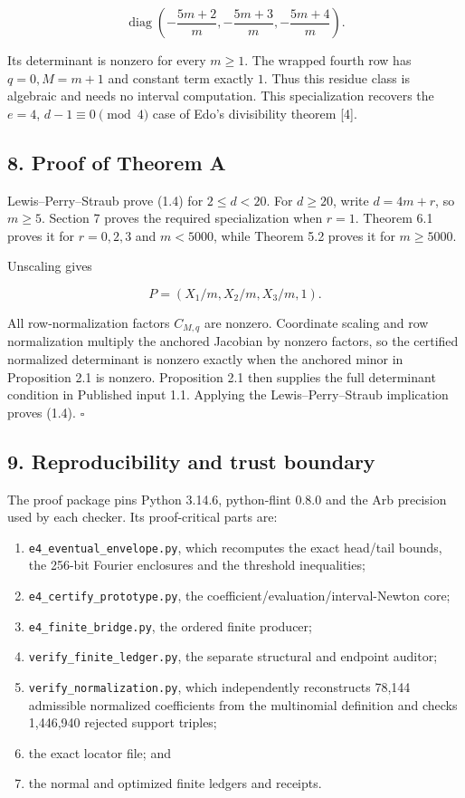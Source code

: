 \documentclass[
  11pt,
  a4paper,
]{article}
\providecommand{\tightlist}{%
  \setlength{\itemsep}{0pt}\setlength{\parskip}{0pt}}
\begin{document}
\[
\operatorname{diag}\left(
-\frac{5m+2}{m},
-\frac{5m+3}{m},
-\frac{5m+4}{m}
\right).
\tag{7.1}
\]

Its determinant is nonzero for every \(m\ge1\). The wrapped fourth row
has \(q=0,M=m+1\) and constant term exactly \(1\). Thus this residue
class is algebraic and needs no interval computation. This
specialization recovers the \(e=4\), \(d-1\equiv0\pmod4\) case of Edo's
divisibility theorem {[}4{]}.

\subsection{8. Proof of Theorem A}\label{proof-of-theorem-a}

Lewis--Perry--Straub prove (1.4) for \(2\le d<20\). For \(d\ge20\),
write \(d=4m+r\), so \(m\ge5\). Section 7 proves the required
specialization when \(r=1\). Theorem 6.1 proves it for \(r=0,2,3\) and
\(m<5000\), while Theorem 5.2 proves it for \(m\ge5000\).

Unscaling gives

\[
P=(X_1/m,X_2/m,X_3/m,1).
\]

All row-normalization factors \(C_{M,q}\) are nonzero. Coordinate
scaling and row normalization multiply the anchored Jacobian by nonzero
factors, so the certified normalized determinant is nonzero exactly when
the anchored minor in Proposition 2.1 is nonzero. Proposition 2.1 then
supplies the full determinant condition in Published input 1.1. Applying
the Lewis--Perry--Straub implication proves (1.4). \(\square\)

\subsection{9. Reproducibility and trust
boundary}\label{reproducibility-and-trust-boundary}

The proof package pins Python 3.14.6, python-flint 0.8.0 and the Arb
precision used by each checker. Its proof-critical parts are:

\begin{enumerate}
\def\labelenumi{\arabic{enumi}.}
\tightlist
\item
  \texttt{e4\_eventual\_envelope.py}, which recomputes the exact
  head/tail bounds, the 256-bit Fourier enclosures and the threshold
  inequalities;
\item
  \texttt{e4\_certify\_prototype.py}, the
  coefficient/evaluation/interval-Newton core;
\item
  \texttt{e4\_finite\_bridge.py}, the ordered finite producer;
\item
  \texttt{verify\_finite\_ledger.py}, the separate structural and
  endpoint auditor;
\item
  \texttt{verify\_normalization.py}, which independently reconstructs
  78,144 admissible normalized coefficients from the multinomial
  definition and checks 1,446,940 rejected support triples;
\item
  the exact locator file; and
\item
  the normal and optimized finite ledgers and receipts.
\end{enumerate}
\end{document}
